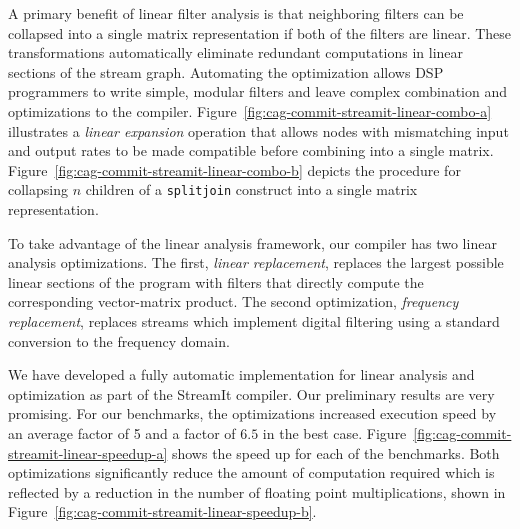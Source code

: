 A primary benefit of linear filter analysis is that neighboring
filters can be collapsed into a single matrix representation if both
of the filters are linear. These transformations automatically
eliminate redundant computations in linear sections of the stream
graph. Automating the optimization allows DSP programmers to write
simple, modular filters and leave complex combination and
optimizations to the compiler. Figure~\ref{fig:cag-commit-streamit-linear-combo-a}
illustrates a {\it linear expansion} operation that allows nodes with
mismatching input and output rates to be made compatible before
combining into a single matrix.  Figure~\ref{fig:cag-commit-streamit-linear-combo-b}
depicts the procedure for collapsing $n$ children of a {\tt splitjoin}
construct into a single matrix representation.

To take advantage of the linear analysis framework, our compiler
has two linear analysis optimizations. The first, {\it linear replacement},
replaces the largest possible linear sections of the program with filters
that directly compute the corresponding vector-matrix product. 
The second optimization, {\it frequency replacement}, replaces streams 
which implement digital filtering using a standard conversion to the 
frequency domain.

We have developed a fully automatic implementation for linear analysis
and optimization as part of the StreamIt compiler. Our preliminary
results are very promising. For our benchmarks, the optimizations
increased execution speed by an average factor of 5 and a factor of
$6.5$ in the best
case. Figure~\ref{fig:cag-commit-streamit-linear-speedup-a} shows the
speed up for each of the benchmarks.  Both optimizations significantly
reduce the amount of computation required which is reflected by a
reduction in the number of floating point multiplications, shown in
Figure~\ref{fig:cag-commit-streamit-linear-speedup-b}.

